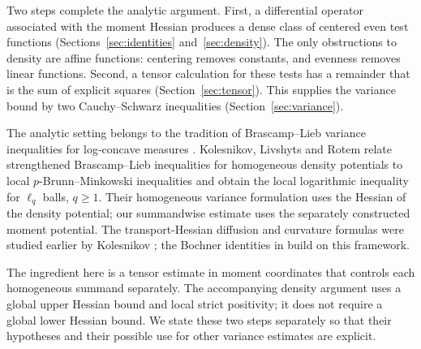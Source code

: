 Two steps complete the analytic argument. First, a differential
operator associated with the moment Hessian produces a dense class
of centered even test functions (Sections~\ref{sec:identities}
and~\ref{sec:density}). The only obstructions to density are affine functions: centering removes
constants, and evenness removes linear functions. Second, a tensor calculation for
these tests has a remainder that is the sum of explicit squares
(Section~\ref{sec:tensor}). This supplies the variance bound by two
Cauchy--Schwarz inequalities (Section~\ref{sec:variance}).

The analytic setting belongs to the tradition of Brascamp--Lieb
variance inequalities for log-concave measures \cite{BrascampLieb1976}.
Kolesnikov, Livshyts and Rotem \cite[Theorem~1.4 and Corollaries~1.5--1.6]{KLR2026}
relate strengthened Brascamp--Lieb inequalities for homogeneous density
potentials to local $p$-Brunn--Minkowski inequalities and obtain the local
logarithmic inequality for $\ell_q$ balls, $q\ge1$.
Their homogeneous variance formulation uses the Hessian of the density
potential; our summandwise estimate uses the separately constructed
moment potential. The transport-Hessian diffusion and curvature formulas
were studied earlier by Kolesnikov \cite{Kolesnikov2014}; the Bochner
identities in \cite[Section~4.3]{KLR2026} build on this framework.

The ingredient here is a tensor estimate in moment coordinates that
controls each homogeneous summand separately. The accompanying density
argument uses a global upper Hessian bound and local strict positivity;
it does not require a global lower Hessian bound. We state these two
steps separately so that their hypotheses and their possible use for
other variance estimates are explicit.
